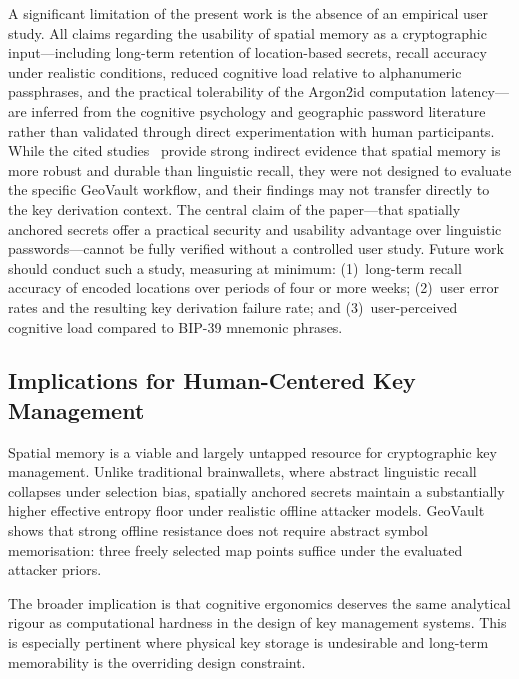 \documentclass[journal,article,accept,pdftex,moreauthors]{Definitions/mdpi}
\begin{document}
A significant limitation of the present work is the absence of an empirical user study. All claims regarding the usability of spatial memory as a cryptographic input---including long-term retention of location-based secrets, recall accuracy under realistic conditions, reduced cognitive load relative to alphanumeric passphrases, and the practical tolerability of the Argon2id computation latency---are inferred from the cognitive psychology and geographic password literature rather than validated through direct experimentation with human participants. While the cited studies~\cite{montello1998new, McNamara2003, Konkle2010, Lukavsky2017, Thorpe2013, MacRae2016} provide strong indirect evidence that spatial memory is more robust and durable than linguistic recall, they were not designed to evaluate the specific GeoVault workflow, and their findings may not transfer directly to the key derivation context. The central claim of the paper---that spatially anchored secrets offer a practical security and usability advantage over linguistic passwords---cannot be fully verified without a controlled user study. Future work should conduct such a study, measuring at minimum: (1)~long-term recall accuracy of encoded locations over periods of four or more weeks; (2)~user error rates and the resulting key derivation failure rate; and (3)~user-perceived cognitive load compared to BIP-39 mnemonic phrases.

\subsection{Implications for Human-Centered Key Management}

Spatial memory is a viable and largely untapped resource for cryptographic key management. Unlike traditional brainwallets, where abstract linguistic recall collapses under selection bias, spatially anchored secrets maintain a substantially higher effective entropy floor under realistic offline attacker models. GeoVault shows that strong offline resistance does not require abstract symbol memorisation: three freely selected map points suffice under the evaluated attacker priors.

The broader implication is that cognitive ergonomics deserves the same analytical rigour as computational hardness in the design of key management systems. This is especially pertinent where physical key storage is undesirable and long-term memorability is the overriding design constraint.

\end{document}

